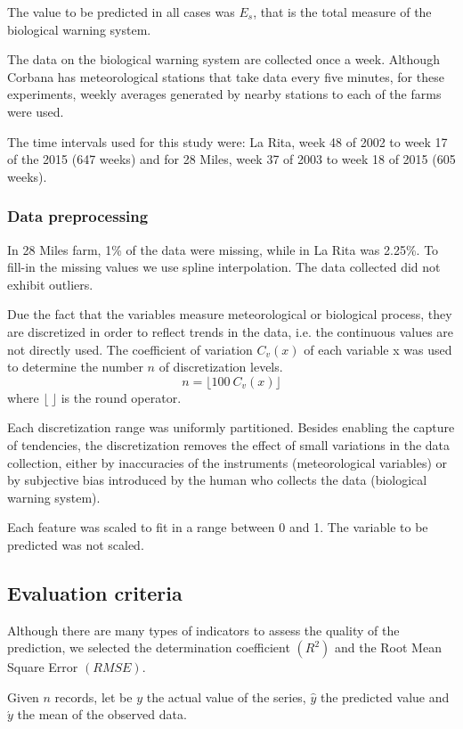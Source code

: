\documentclass[review,authoryear,english]{elsarticle}
\begin{document}
The value to be predicted in all cases was $E_s$, that is the total measure of the biological warning system.  

The data on the biological warning system are collected once a week. Although Corbana has meteorological stations that take data every five minutes, for these experiments, weekly averages generated by nearby stations to each of the farms were used.

The time intervals used for this study were: La Rita, week 48 of 2002 to week 17 of the 2015 (647 weeks) and for 28 Miles, week 37 of 2003 to week 18 of 2015 (605 weeks).

\subsubsection{Data preprocessing}

In 28 Miles farm, 1\% of the data were missing, while in La Rita was 2.25\%. To fill-in the missing values we use spline interpolation. The data collected did not exhibit outliers.

Due the fact that the variables measure meteorological or biological process, they are discretized in order to reflect trends in the data, i.e. the continuous values are not directly used. The coefficient of variation $C_v(x)$ of each variable x was used to determine the number $n$ of discretization levels.
$$n= \lfloor 100 \ C_v(x) \rfloor$$
where $\lfloor \ \rfloor$  is the round operator.

Each discretization range was uniformly partitioned. Besides enabling the capture of tendencies, the discretization removes the effect of small variations in the data collection, either by inaccuracies of the instruments (meteorological variables) or by subjective bias introduced by the human who collects the data (biological warning system). 

Each feature was scaled to fit in a range between 0 and 1. The variable to be predicted was not scaled.

\subsection{Evaluation criteria}

Although there are many types of indicators to assess the quality of the prediction, we selected the determination coefficient $(R^2)$ and the Root Mean Square Error $(RMSE)$.  

Given $n$ records, let be $y$ the actual value of the series, $\hat{y}$ the predicted value and $\acute{y}$ the mean of the observed data.
\end{document}
